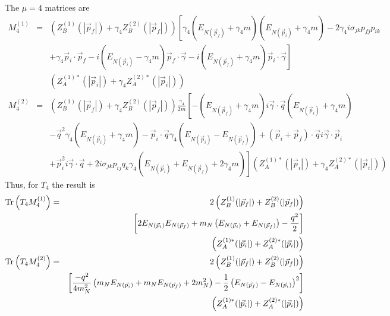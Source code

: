 \documentclass[12pt]{article}
\begin{document}
The $\mu=4$ matrices are
\begin{eqnarray}
M^{(1)}_4 &=& 
     \left(Z_B^{(1)}(|\vec{p}_f|)+\gamma_4Z_B^{(2)}(|\vec{p}_f|)\right)
     \left[
     \gamma_4\left(E_{N(\vec{p}_f)}+\gamma_4m\right)
     \left(E_{N(\vec{p}_i)}+\gamma_4m\right)
     - 2\gamma_4i\sigma_{jk}p_{fj}p_{ik} \right.\nonumber \\
  && \left. + \gamma_4\vec{p}_i\cdot\vec{p}_f
     - i\left(E_{N(\vec{p}_i)}-\gamma_4m\right)\vec{p}_f\cdot\vec\gamma
     - i\left(E_{N(\vec{p}_f)}+\gamma_4m\right)\vec{p}_i\cdot\vec\gamma
     \right] \nonumber \\
  && \left(Z_A^{(1)*}(|\vec{p}_i|)+\gamma_4Z_A^{(2)*}(|\vec{p}_i|)\right)
     \nonumber \\
M^{(2)}_4 &=& 
     \left(Z_B^{(1)}(|\vec{p}_f|)+\gamma_4Z_B^{(2)}(|\vec{p}_f|)\right)
     \frac{\gamma_4}{2m}\left[
     -\left(E_{N(\vec{p}_f)}+\gamma_4m\right)
     i\vec\gamma\cdot\vec q\left(E_{N(\vec{p}_i)}+\gamma_4m\right)
     \right.\nonumber \\
  && -\vec q^2\gamma_4\left(E_{N(\vec{p}_i)}+\gamma_4m\right)
     -\vec p_i\cdot\vec q\gamma_4\left(E_{N(\vec{p}_i)}-
     E_{N(\vec{p}_f)}\right)
     +\left(\vec p_i+\vec p_f\right)\cdot\vec qi\vec\gamma\cdot\vec p_i
     \nonumber \\
  && \left. +\vec p_i^2i\vec\gamma\cdot\vec q
     +2i\sigma_{jk}p_{ij}q_k\gamma_4\left(E_{N(\vec{p}_i)}
     +E_{N(\vec{p}_f)}+2\gamma_4m\right)
     \right]
     \left(Z_A^{(1)*}(|\vec{p}_i|)+\gamma_4Z_A^{(2)*}(|\vec{p}_i|)\right)
     \nonumber
\end{eqnarray}
Thus, for $T_4$ the result is
\begin{eqnarray}
{\rm Tr}\left(T_4 M^{(1)}_4\right)
 &=& 2\left(Z_B^{(1)}(|\vec{p}_f|)+Z_B^{(2)}(|\vec{p}_f|)\right)
     \nonumber \\
  && \left[2E_{N(\vec{p}_i)}E_{N(\vec{p}_f)}
     +m_N\left(E_{N(\vec{p}_i)}+E_{N(\vec{p}_f)}\right)-\frac{q^2}{2}\right]
     \nonumber \\
  && \left(Z_A^{(1)*}(|\vec{p}_i|)+Z_A^{(2)*}(|\vec{p}_i|)\right) \nonumber \\
{\rm Tr}\left(T_4 M^{(2)}_4\right)
 &=& 2\left(Z_B^{(1)}(|\vec{p}_f|)+Z_B^{(2)}(|\vec{p}_f|)\right)
     \nonumber \\
  && \left[\frac{-q^2}{4m_N^2}\left(m_NE_{N(\vec{p}_i)}+m_NE_{N(\vec{p}_f)}
     +2m_N^2\right)-\frac{1}{2}\left(E_{N(\vec{p}_f)}-E_{N(\vec{p}_i)}
     \right)^2\right] \nonumber \\
  && \left(Z_A^{(1)*}(|\vec{p}_i|)+Z_A^{(2)*}(|\vec{p}_i|)\right) \nonumber \\
\end{eqnarray}
\end{document}
